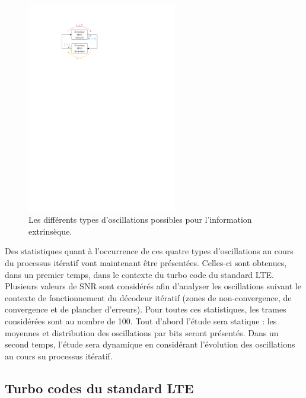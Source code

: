 \begin{figure}[tb]
	\centering
	\includegraphics[width=6.5cm]{main/ch2_fig/ipe/osc.pdf}
	\caption{\label{fig:osc}Les différents types d'oscillations possibles pour l'information extrinsèque.}
\end{figure}

Des statistiques quant à l’occurrence de ces quatre types d'oscillations au cours du processus itératif vont maintenant être 
présentées. Celles-ci sont obtenues, dans un premier temps, dans le contexte du turbo code du standard LTE.
Plusieurs valeurs de SNR sont considérés afin d'analyser les oscillations suivant le contexte de fonctionnement du 
décodeur itératif (zones de non-convergence, de convergence et de plancher d'erreurs). Pour toutes ces statistiques, les 
trames considérées sont au nombre de 100. Tout d'abord l'étude sera statique : les moyennes et distribution des 
oscillations par bits seront présentés. Dans un second temps, l'étude sera dynamique en considérant l'évolution des 
oscillations au cours su processus itératif.

\subsection{Turbo codes du standard LTE}
